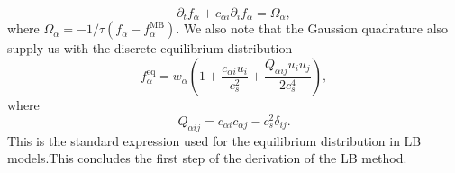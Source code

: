 \documentclass[11pt,a4paper]{report}
\begin{document}
\begin{equation}\label{eq:descrite boltzmann equation}
\partial_tf_\alpha + c_{\alpha i}\partial_if_\alpha = \Omega_\alpha,
\end{equation} 
where $\Omega_\alpha = -1/\tau(f_\alpha - f^\mathrm{MB}_\alpha)$. We also note that the Gaussion quadrature also supply us with the discrete equilibrium distribution 
\begin{equation}\label{eq:lb equilibrium distrubution}
f_\alpha^\mathrm{eq} = w_\alpha\left(1 + \frac{c_{\alpha i}u_i}{c_s^2} + \frac{Q_{\alpha ij}u_iu_j}{2c_s^4}\right),
\end{equation} 
where
\begin{equation}
Q_{\alpha ij} = c_{\alpha i}c_{\alpha j} - c_s^2\delta_{ij}.
\end{equation}
This is the standard expression used for the equilibrium distribution in LB models.This concludes the first step of the derivation of the LB method.
\end{document}
